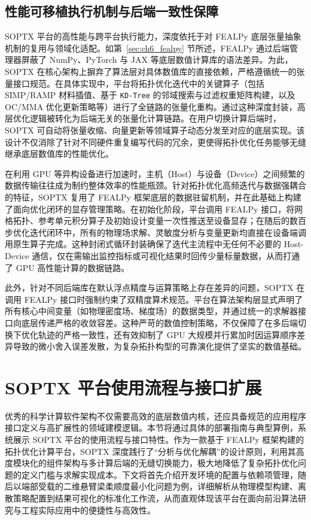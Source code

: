 \subsection{性能可移植执行机制与后端一致性保障}
\label{subsec:muti_backend}

SOPTX 平台的高性能与跨平台执行能力，深度依托于对 FEALPy 底层张量抽象机制的复用与领域化适配。如第~\ref{sec:ch6_fealpy} 节所述，FEALPy 通过后端管理器屏蔽了 NumPy、PyTorch 与 JAX 等底层数值计算库的语法差异。为此，SOPTX 在核心架构上摒弃了算法层对具体数值库的直接依赖，严格遵循统一的张量接口规范。在具体实现中，平台将拓扑优化迭代中的关键算子（包括 SIMP/RAMP 材料插值、基于 \texttt{KD-Tree} 的邻域搜索与过滤权重矩阵构建，以及 OC/MMA 优化更新策略等）进行了全链路的张量化重构。通过这种深度封装，高层优化逻辑被转化为后端无关的张量化计算链路。在用户切换计算后端时，SOPTX 可自动将张量收缩、向量更新等领域算子动态分发至对应的底层实现。该设计不仅消除了针对不同硬件重复编写代码的冗余，更使得拓扑优化任务能够无缝继承底层数值库的性能优化。

在利用 GPU 等异构设备进行加速时，主机（Host）与设备（Device）之间频繁的数据传输往往成为制约整体效率的性能瓶颈。针对拓扑优化高频迭代与数据强耦合的特征，SOPTX 复用了 FEALPy 框架底层的数据驻留机制，并在此基础上构建了面向优化闭环的显存管理策略。在初始化阶段，平台调用 FEALPy 接口，将网格拓扑、参考单元积分算子及初始设计变量一次性推送至设备显存；在随后的数百步优化迭代闭环中，所有的物理场求解、灵敏度分析与变量更新均直接在设备端调用原生算子完成。这种封闭式循环封装确保了迭代主流程中无任何不必要的 Host-Device 通信，仅在需输出监控指标或可视化结果时回传少量标量数据，从而打通了 GPU 高性能计算的数据链路。

此外，针对不同后端库在默认浮点精度与运算策略上存在差异的问题，SOPTX 在调用 FEALPy 接口时强制约束了双精度算术规范。平台在算法架构层显式声明了所有核心中间变量（如物理密度场、梯度场）的数据类型，并通过统一的求解器接口向底层传递严格的收敛容差。这种严苛的数值控制策略，不仅保障了在多后端切换下优化轨迹的严格一致性，还有效抑制了 GPU 大规模并行累加时因运算顺序差异导致的微小舍入误差发散，为复杂拓扑构型的可靠演化提供了坚实的数值基础。


\section{SOPTX 平台使用流程与接口扩展}
\label{sec:soptx_usage}

优秀的科学计算软件架构不仅需要高效的底层数值内核，还应具备规范的应用程序接口定义与高扩展性的领域建模逻辑。本节将通过具体的部署指南与典型算例，系统展示 SOPTX 平台的使用流程与接口特性。作为一款基于 FEALPy 框架构建的拓扑优化计算平台，SOPTX 深度践行了“分析与优化解耦”的设计原则，利用其高度模块化的组件架构与多计算后端的无缝切换能力，极大地降低了复杂拓扑优化问题的定义门槛与求解实现成本。下文将首先介绍开发环境的配置与依赖项管理，随后以端部受载的二维悬臂梁柔顺度最小化问题为例，详细解析从物理模型构建、离散策略配置到结果可视化的标准化工作流，从而直观体现该平台在面向前沿算法研究与工程实际应用中的便捷性与高效性。


